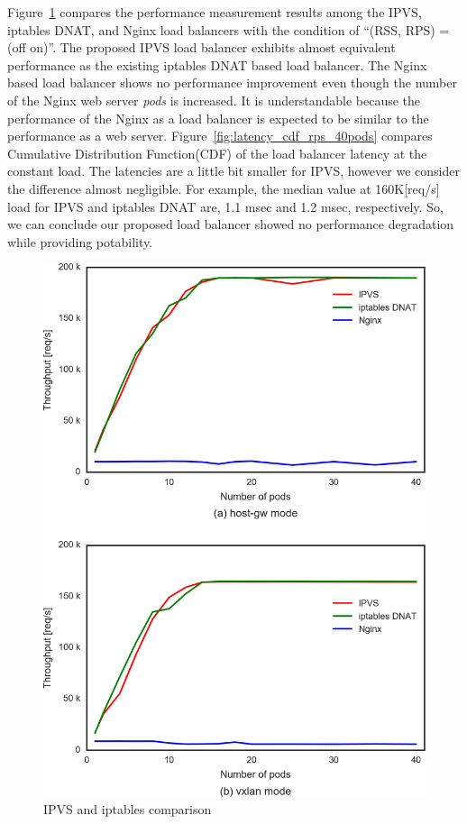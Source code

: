 Figure~\ref{fig:IPVS-iptables-nginx_2figs} compares the performance measurement results 
among the IPVS, iptables DNAT, and Nginx load balancers
with the condition of \enquote{(RSS, RPS) = (off on)}.
The proposed IPVS load balancer exhibits almost equivalent performance as the existing iptables DNAT based load balancer. 
The Nginx based load balancer shows no performance improvement even though the number of the Nginx web server {\em pods} is increased.
It is understandable because the performance of the Nginx as a load balancer is expected to be similar to the performance as a web server.
Figure~\ref{fig:latency_cdf_rps_40pods} compares Cumulative Distribution Function(CDF) of the load balancer latency at the constant load.
The latencies are a little bit smaller for IPVS, however we consider the difference almost negligible.
For example, the median value at 160K[req/s] load for IPVS and iptables DNAT are, 1.1 msec and 1.2 msec, respectively.
So, we can conclude our proposed load balancer showed no performance degradation while providing potability.

\begin{figure}
\includegraphics[width=\columnwidth]{Figs/ipvs-iptables-nginx_2figs}
\caption{IPVS and iptables comparison}
\label{fig:IPVS-iptables-nginx_2figs}
\end{figure}

